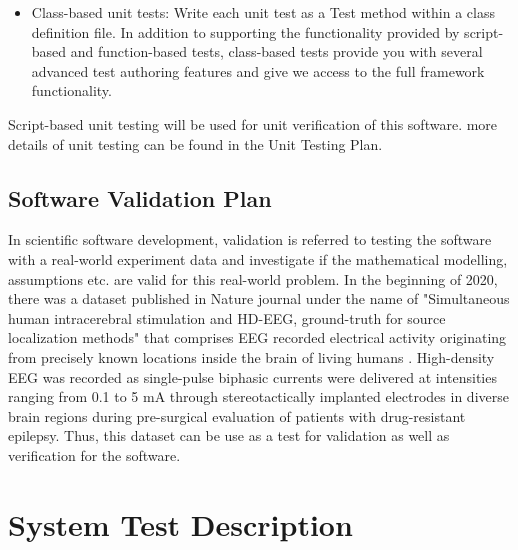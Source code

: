 \documentclass[12pt, titlepage]{article}
\begin{document}
\begin{itemize}
\begin{itemize}
\item Class-based unit tests: Write each unit test as a Test method within a class definition file. In addition to supporting the functionality provided by script-based and function-based tests, class-based tests provide you with several advanced test authoring features and give we access to the full framework functionality.  
\end{itemize}

Script-based unit testing will be used for unit verification of this software. more details of unit testing can be found in the Unit Testing Plan.
\end{itemize}


%

\subsection{Software Validation Plan}

In scientific software development, validation is referred to testing the software with a real-world experiment data and investigate if the mathematical modelling, assumptions etc. are valid for this real-world problem. In the beginning of 2020, there was a dataset published in Nature journal under the name of "Simultaneous human intracerebral stimulation and HD-EEG, ground-truth for source localization methods"  that comprises EEG recorded electrical activity originating from precisely known locations inside the brain of living humans \cite{Mikulan2020} . High-density EEG was recorded as single-pulse biphasic currents were delivered at intensities ranging from 0.1 to 5 mA through stereotactically implanted electrodes in diverse brain regions during pre-surgical evaluation of patients with drug-resistant epilepsy. Thus, this dataset can be use as a test for validation as well as verification for the software.\\

\section{System Test Description}
	
\end{document}

